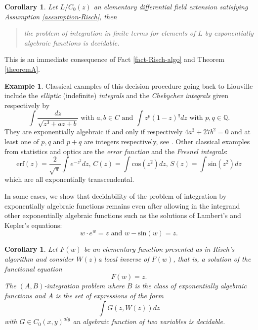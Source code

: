 \documentclass[12pt]{amsart}
\theoremstyle{definition}
\newtheorem{exam}[defn]{Example}
\theoremstyle{plain}
\newtheorem{cor}[defn]{Corollary}
\theoremstyle{exampstyle}\newtheorem{thmx}{Theorem}
\theoremstyle{exampstyle}\newtheorem{thmxbis}{Theorem}
\begin{document}
 \begin{cor}\label{cor-Rischalgo}
Let $L/C_0(z)$ an elementary differential field extension satisfying Assumption \ref{assumption-Risch}, then 
\begin{quote} 
the problem of integration in finite terms for elements of $L$ by {\em exponentially algebraic functions} is decidable. 
\end{quote}
 \end{cor}
\noindent This is an immediate consequence of Fact \ref{fact-Risch-algo} and Theorem \ref{theoremA}. 

\begin{exam} 
Classical examples of this decision procedure going back to Liouville include the {\em elliptic} (indefinite) {\em integrals} and the {\em Chebychev integrals} given respectively by
$$\int \frac{dz}{\sqrt{z^3 + az + b}} \text{ with } a,b \in C \text{ and } \int z^p (1-z)^q dz \text{ with } p,q \in \mathbb{Q}.$$
They are exponentially algebraic if and only if respectively $4a^3 + 27b^2 = 0$ and at least one of $p,q$ and $p+q$ are integers respectively, see \cite[p.37]{Ritt-book}. Other classical examples from statistics and optics are the {\em error function} and the {\em Fresnel integrals}:
$$ \mathrm{erf}(z) = \frac 2 {\sqrt{\pi}} \int e^{-z^2}dz\text{, } C(z) = \int \mathrm{cos}(z^2)dz\text{, } S(z) = \int \mathrm{sin}(z^2)dz$$
which are all exponentially transcendental.
\end{exam} 

In some cases, we show that decidability of the problem of integration by exponentially algebraic functions remains even after allowing in the integrand other exponentially algebraic functions such as the solutions of Lambert's and Kepler's equations:
$$ w \cdot e^w = z \text{ and } w - \mathrm{sin}(w) = z.$$

\begin{cor} \label{cor-Lambert}
Let $F(w)$ be an elementary function presented as in Risch's algorithm and consider $W(z)$a local inverse of $F(w)$, that is, a solution of the functional equation
$$F(w) = z.$$
The $(A,B)$-integration problem where $B$ is the class of exponentially algebraic functions and $A$ is the set of expressions  of the form $$\int G(z,W(z)) dz$$ 
with $G \in C_0(x,y)^{alg}$ an {\em algebraic function of two variables} is decidable.
\end{cor}
\end{document}
